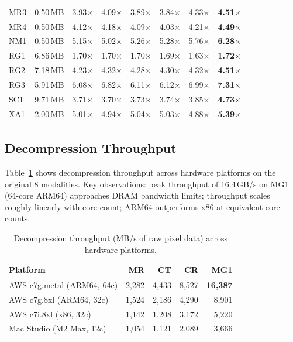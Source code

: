 \documentclass[10pt,twocolumn]{article}
\begin{document}
\begin{table}[h]
\begin{tabular}{lrrrrrrr}
    MR3 & 0.50\,MB & 3.93$\times$ & 4.09$\times$ & 3.89$\times$ & 3.84$\times$ & 4.33$\times$ & \textbf{4.51$\times$} \\
    MR4 & 0.50\,MB & 4.12$\times$ & 4.18$\times$ & 4.09$\times$ & 4.03$\times$ & 4.21$\times$ & \textbf{4.49$\times$} \\
    NM1 & 0.50\,MB & 5.15$\times$ & 5.02$\times$ & 5.26$\times$ & 5.28$\times$ & 5.76$\times$ & \textbf{6.28$\times$} \\
    RG1 & 6.86\,MB & 1.70$\times$ & 1.70$\times$ & 1.70$\times$ & 1.69$\times$ & 1.63$\times$ & \textbf{1.72$\times$} \\
    RG2 & 7.18\,MB & 4.23$\times$ & 4.32$\times$ & 4.28$\times$ & 4.30$\times$ & 4.32$\times$ & \textbf{4.51$\times$} \\
    RG3 & 5.91\,MB & 6.08$\times$ & 6.82$\times$ & 6.11$\times$ & 6.12$\times$ & 6.99$\times$ & \textbf{7.31$\times$} \\
    SC1 & 9.71\,MB & 3.71$\times$ & 3.70$\times$ & 3.73$\times$ & 3.74$\times$ & 3.85$\times$ & \textbf{4.73$\times$} \\
    XA1 & 2.00\,MB & 5.01$\times$ & 4.94$\times$ & 5.04$\times$ & 5.03$\times$ & 4.88$\times$ & \textbf{5.39$\times$} \\
    \bottomrule
  \end{tabular}
\end{table}

\subsection{Decompression Throughput}

Table~\ref{tab:throughput} shows decompression throughput across hardware platforms on the original 8 modalities. Key observations: peak throughput of 16.4\,GB/s on MG1 (64-core ARM64) approaches DRAM bandwidth limits; throughput scales roughly linearly with core count; ARM64 outperforms x86 at equivalent core counts.

\begin{table}[h]
  \centering
  \caption{Decompression throughput (MB/s of raw pixel data) across hardware platforms.}
  \label{tab:throughput}
  \small
  \setlength{\tabcolsep}{2.5pt}
  \begin{tabular}{lrrrr}
    \toprule
    Platform & MR & CT & CR & MG1 \\
    \midrule
    AWS c7g.metal (ARM64, 64c) & 2,282 & 4,433 & 8,527 & \textbf{16,387} \\
    AWS c7g.8xl (ARM64, 32c)   & 1,524 & 2,186 & 4,290 & 8,901 \\
    AWS c7i.8xl (x86, 32c)     & 1,142 & 1,208 & 3,172 & 5,220 \\
    Mac Studio (M2 Max, 12c)   & 1,054 & 1,121 & 2,089 & 3,666 \\
    \bottomrule
  \end{tabular}
\end{table}
\end{document}
